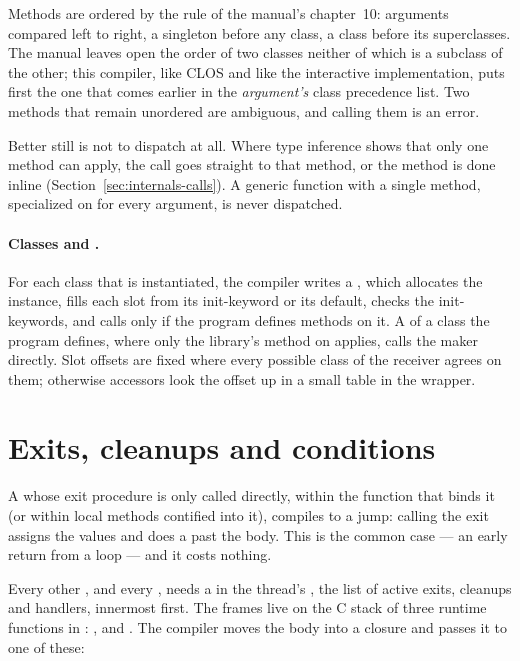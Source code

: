 Methods are ordered by the rule of the manual's chapter~10: arguments
compared left to right, a singleton before any class, a class before its
superclasses. The manual leaves open the order of two classes neither of
which is a subclass of the other; this compiler, like CLOS and like the
interactive implementation, puts first the one that comes earlier in the
\emph{argument's} class precedence list. Two methods that remain
unordered are ambiguous, and calling them is an error.

Better still is not to dispatch at all. Where type inference shows that
only one method can apply, the call goes straight to that method, or the
method is done inline (Section~\ref{sec:internals-calls}). A generic
function with a single method, specialized on  for every
argument, is never dispatched.

\paragraph{Classes and .}
For each class that is instantiated, the compiler writes a
, which allocates the instance, fills each slot from its
init-keyword or its default, checks the init-keywords, and calls
 only if the program defines methods on it. A
 of a class the program defines, where only the library's
 method on  applies, calls the maker directly.
Slot offsets are fixed where every possible class of the receiver agrees
on them; otherwise accessors look the offset up in a small table in the
wrapper.

\section{Exits, cleanups and conditions}\label{sec:internals-exits}

A  whose exit procedure is only called directly, within
the function that binds it (or within local methods contified into it),
compiles to a jump: calling the exit assigns the values and does a
 past the body. This is the common case --- an early return
from a loop --- and it costs nothing.

Every other , and every , needs a
 in the thread's , the list of active
exits, cleanups and handlers, innermost first. The frames live on the C
stack of three runtime functions in :
,  and
. The compiler moves the body into a closure and
passes it to one of these:

